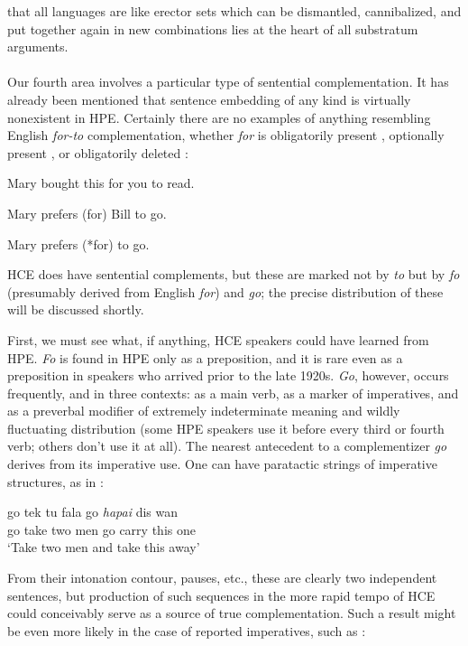 that all languages are like erector sets which can be dismantled, cannibalized, and put together again in new combinations lies at the heart of all substratum arguments.\\\\

Our fourth area involves a particular type of sentential comple\-mentation. It has already been mentioned that sentence embedding of any kind is virtually nonexistent in HPE. Certainly there are no examples of anything resembling English \textit{for-to} complementation,
whether \textit{for} is obligatorily present , optionally present , or obligatorily deleted :

\ea\label{ex:56}
 Mary bought this for you to read.
\z

\ea\label{ex:57}
 Mary prefers (for) Bill to go.
\z

\ea\label{ex:58}
 Mary prefers (*for) to go.
\z

\noindent HCE does have sentential complements, but these are marked not by \textit{to} but by \textit{fo} (presumably derived from English \textit{for}) and \textit{go}; the precise distribution of these will be discussed shortly.

First, we must see what, if anything, HCE speakers could have learned from HPE. \textit{Fo} is found in HPE only as a preposition, and it is rare even as a preposition in speakers who arrived prior to the late 1920s. \textit{Go}, however, occurs frequently, and in three contexts: as a main verb, as a marker of imperatives, and as a preverbal modifier of extremely indeterminate meaning and wildly fluctuating distribution (some HPE speakers use it before every third or fourth verb; others don't use it at all). The nearest antecedent to a complementizer \textit{go} derives from its imperative use. One can have paratactic strings of imperative structures, as in :

\ea\label{ex:59}
\gll go tek tu fala go \emph{hapai} dis wan\\
go take two men go carry this one \\
\glt `Take two men and take this away'
\z

\noindent From their intonation contour, pauses, etc., these are clearly two independent sentences, but production of such sequences in the more rapid tempo of HCE could conceivably serve as a source of true comple\-mentation. Such a result might be even more likely in the case of reported imperatives, such as :

